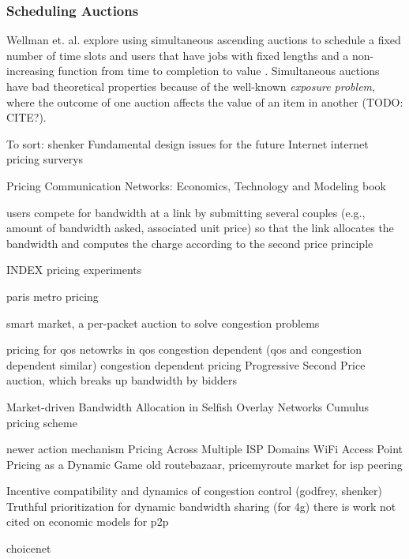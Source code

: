 \subsubsection{Scheduling Auctions}
Wellman et. al. explore using simultaneous ascending auctions to schedule a fixed number of time slots and users that have jobs with fixed lengths and a non-increasing function from time to completion to value \cite{wellman01, wellman05}.
Simultaneous auctions have bad theoretical properties because of the well-known \emph{exposure problem}, where the outcome of one auction affects the value of an item in another (TODO: CITE?).


To sort:
shenker Fundamental design issues for the future Internet \cite{shenker95}
internet pricing surverys\cite{stiller01, falkner00, odlyzko01}

Pricing Communication Networks: Economics, Technology and Modeling book \cite{courcoubetis03}

users compete for bandwidth at a link by submitting several couples (e.g., amount of bandwidth asked, associated unit price) so that the link allocates the bandwidth and computes the charge according to the second price principle \cite{maille06}


INDEX pricing experiments \cite{altmann99, edell99}

paris metro pricing \cite{odlyzko99}

smart market, a per-packet auction to solve congestion problems

pricing for qos netowrks \cite{dasilva00, marbach04}
in qos congestion dependent (qos and congestion dependent similar) \cite{shu03}
congestion dependent pricing \cite{mason95, peha97, paschalidis00, la00, la02}
Progressive Second Price auction, which breaks up bandwidth by bidders  \cite{lazar98, lazar99, semret99, semret00,maille03, bitsaki05, beltran07}

Market-driven Bandwidth Allocation in Selfish Overlay Networks \cite{wang05}
Cumulus pricing scheme \cite{reichl01, stiller01cumulus, reichl01edgepricing, reichl03, hayel05}

newer action mechanism \cite{dramitinos07}
Pricing Across Multiple ISP Domains \cite{saberi07}
WiFi Access Point Pricing as a Dynamic Game \cite{musacchio06}
old routebazaar, pricemyroute \cite{esquivel09, pricemyroute11}
market for isp peering \cite{hau09}

Incentive compatibility and dynamics of congestion control (godfrey, shenker) \cite{godfrey10}
Truthful prioritization for dynamic bandwidth sharing (for 4g) \cite{shnayder14}
there is work not cited on economic models for p2p

choicenet \cite{wolf14}

